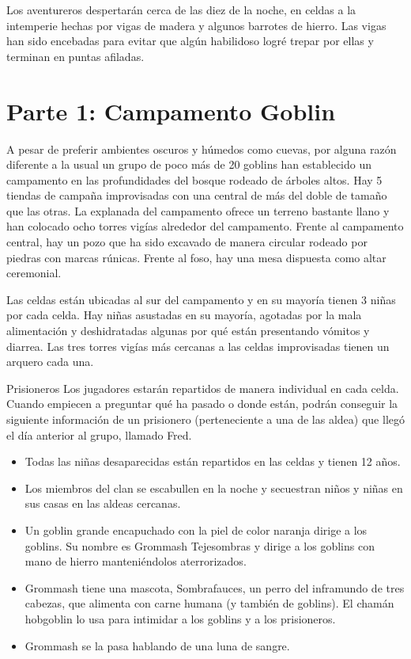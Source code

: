 \documentclass[10pt,twoside,twocolumn,openany]{dndbook}
\begin{document}
Los aventureros despertarán cerca de las diez de la noche, en celdas a la intemperie hechas por vigas de 
madera y algunos barrotes de hierro. Las vigas han sido encebadas para evitar que algún habilidoso 
logré trepar por ellas y terminan en puntas afiladas.

\section{Parte 1: Campamento Goblin}

A pesar de preferir ambientes oscuros y húmedos como cuevas, por alguna razón diferente a la usual 
un grupo de poco más de 20 goblins han establecido un campamento en las profundidades del bosque rodeado de 
árboles altos. Hay 5 tiendas de campaña improvisadas con una central de más del doble de tamaño que 
las otras. La explanada del campamento ofrece un terreno bastante llano y han colocado ocho torres 
vigías alrededor del campamento. Frente al campamento central, hay un pozo que ha sido excavado de 
manera circular rodeado por piedras con marcas rúnicas. Frente al foso, hay una mesa dispuesta como 
altar ceremonial.

Las celdas están ubicadas al sur del campamento y en su mayoría tienen 3 niñas por cada celda. Hay 
niñas asustadas en su mayoría, agotadas por la mala alimentación y deshidratadas algunas por qué 
están presentando vómitos y diarrea. Las tres torres vigías más cercanas a las celdas improvisadas 
tienen un arquero cada una. 

\begin{DndComment}{Prisioneros}
Los jugadores estarán repartidos de manera individual en cada celda. Cuando empiecen a preguntar qué 
ha pasado o donde están, podrán conseguir la siguiente información de un prisionero (perteneciente 
a una de las aldea) que llegó el día anterior al grupo, llamado Fred.

\begin{itemize}
    \item Todas las niñas desaparecidas están repartidos en las celdas y tienen 12 años.
    \item Los miembros del clan se escabullen en la noche y secuestran niños y niñas en sus casas en las aldeas cercanas.
    \item Un goblin grande encapuchado con la piel de color naranja dirige a los goblins. Su nombre es Grommash Tejesombras y dirige a los goblins con mano de hierro manteniéndolos aterrorizados.
    \item Grommash tiene una mascota, Sombrafauces, un perro del inframundo de tres cabezas, que alimenta con carne humana (y también de goblins). El chamán hobgoblin lo usa para intimidar a los goblins y a los prisioneros.
    \item Grommash se la pasa hablando de una luna de sangre.
\end{itemize}

\end{DndComment}
\end{document}
